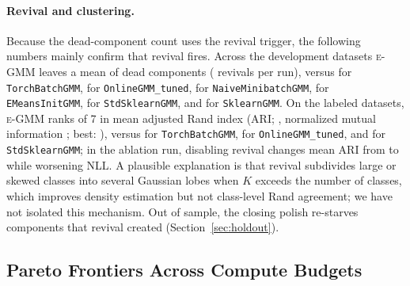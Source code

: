 \documentclass[10pt]{article} %
\newcommand{\egmm}{\textsc{e-GMM}}
\begin{document}
\paragraph{Revival and clustering.} Because the dead-component count uses the revival trigger, the following numbers mainly confirm that revival fires. Across the development datasets \egmm{} leaves a mean of \rDeadEGMM{} dead components (\rRevivalsEGMM{} revivals per run), versus \rDeadTorchBatchGMM{} for \texttt{TorchBatchGMM}, \rDeadOnlineGMMtuned{} for \texttt{OnlineGMM\_tuned}, \rDeadNaiveMinibatchGMM{} for \texttt{NaiveMinibatchGMM}, \rDeadEMeansInitGMM{} for \texttt{EMeansInitGMM}, \rDeadStandardizedSklearnGMM{} for \texttt{StdSklearnGMM}, and \rDeadSklearnGMM{} for \texttt{SklearnGMM}. On the \rnLabeled{} labeled datasets, \egmm{} ranks \rARIRankEGMM{} of 7 in mean adjusted Rand index (ARI; \rARIEGMM{}, normalized mutual information \rNMIEGMM; best: \rARIBestName{} \rARIBest), versus \rARITorchBatchGMM{} for \texttt{TorchBatchGMM}, \rARIOnlineGMMtuned{} for \texttt{OnlineGMM\_tuned}, and \rARIStandardizedSklearnGMM{} for \texttt{StdSklearnGMM}; in the ablation run, disabling revival changes mean ARI from \rAblARIEGMM{} to \rAblARIEGMMnorevival{} while worsening NLL. A plausible explanation is that revival subdivides large or skewed classes into several Gaussian lobes when $K$ exceeds the number of classes, which improves density estimation but not class-level Rand agreement; we have not isolated this mechanism. Out of sample, the closing polish re-starves components that revival created (Section~\ref{sec:holdout}).

\subsection{Pareto Frontiers Across Compute Budgets}
\end{document}
